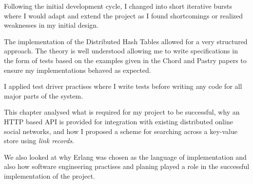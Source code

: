 Following the initial development cycle, I changed into short iterative bursts where I would adapt and extend the project as I found shortcomings or realized weaknesses in my initial design.

The implementation of the Distributed Hash Tables allowed for a very structured approach. The theory is well understood allowing me to write specifications in the form of tests based on the examples given in the Chord \cite{chord} and Pastry \cite{pastry} papers to ensure my implementations behaved as expected.

I applied test driver practises where I write tests before writing any code for all major parts of the system.

\mbox{}

This chapter analysed what is required for my project to be successful, why an HTTP based API is provided for integration with existing distributed online social networks, and how I proposed a scheme for searching across a key-value store using \emph{link records}.

We also looked at why Erlang was chosen as the language of implementation and also how software engineering practises and planing played a role in the successful implementation of the project.
